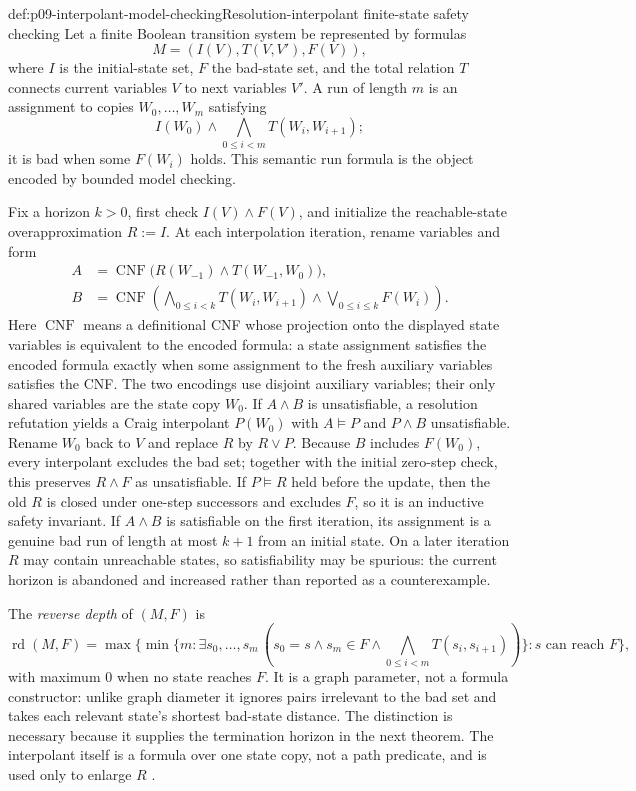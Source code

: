 \begin{hbmethod}{def:p09-interpolant-model-checking}{Resolution-interpolant finite-state safety checking}
Let a finite Boolean transition system be represented by formulas
\[
 M=(I(V),T(V,V'),F(V)),
\]
where \(I\) is the initial-state set, \(F\) the bad-state set, and the total
relation \(T\) connects current variables \(V\) to next variables \(V'\).
A run of length \(m\) is an assignment to copies
\(W_0,\ldots,W_m\) satisfying
\[
 I(W_0)\land\bigwedge_{0\leq i<m}T(W_i,W_{i+1});
\]
it is bad when some \(F(W_i)\) holds.  This semantic run formula is the object
encoded by bounded model checking.

Fix a horizon \(k>0\), first check \(I(V)\land F(V)\), and initialize the
reachable-state overapproximation \(R:=I\).  At each interpolation iteration,
rename variables and form
\[
\begin{aligned}
 A&=\operatorname{CNF}
   \bigl(R(W_{-1})\land T(W_{-1},W_0)\bigr),\\
 B&=\operatorname{CNF}
   \left(
    \bigwedge_{0\leq i<k}T(W_i,W_{i+1})
    \land\bigvee_{0\leq i\leq k}F(W_i)
   \right).
\end{aligned}
\]
Here \(\operatorname{CNF}\) means a definitional CNF whose projection onto the
displayed state variables is equivalent to the encoded formula: a state
assignment satisfies the encoded formula exactly when some assignment to the
fresh auxiliary variables satisfies the CNF.  The two
encodings use disjoint auxiliary variables; their only shared variables are
the state copy \(W_0\).  If \(A\land B\) is unsatisfiable, a
resolution refutation yields a Craig interpolant \(P(W_0)\) with
\(A\models P\) and \(P\land B\) unsatisfiable.  Rename \(W_0\) back to \(V\)
and replace \(R\) by \(R\lor P\).  Because \(B\) includes \(F(W_0)\), every
interpolant excludes the bad set; together with the initial zero-step check,
this preserves \(R\land F\) as unsatisfiable.  If \(P\models R\) held before
the update, then the old \(R\) is closed under one-step successors and excludes
\(F\), so it is an inductive safety invariant.  If \(A\land B\) is satisfiable
on the first iteration, its assignment is a genuine bad run of length at most
\(k+1\) from an initial state.  On a
later iteration \(R\) may contain unreachable states, so satisfiability may be
spurious: the current horizon is abandoned and increased rather than reported
as a counterexample.

The \emph{reverse depth} of \((M,F)\) is
\[
 \operatorname{rd}(M,F)=
 \max\{\min\{m:\exists s_0,\ldots,s_m\,
       (s_0=s\land s_m\in F\land
        \bigwedge_{0\leq i<m}T(s_i,s_{i+1}))\}:
        s\text{ can reach }F\},
\]
with maximum \(0\) when no state reaches \(F\).  It is a graph parameter, not
a formula constructor: unlike graph diameter it ignores pairs irrelevant to
the bad set and takes each relevant state's shortest bad-state distance.  The
distinction is necessary because it supplies the termination horizon in the
next theorem.  The interpolant itself is a formula over one state copy, not a
path predicate, and is used only to enlarge \(R\)
\cite{McMillan2003}.
\end{hbmethod}

